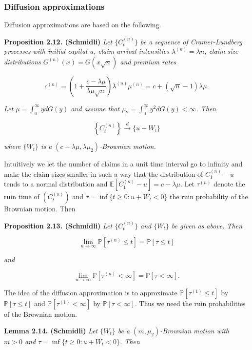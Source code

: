 \documentclass[a4paper,10pt,openany]{book}
\begin{document}
\hypertarget{diffusion-approximations}{%
\subsubsection{Diffusion approximations}\label{diffusion-approximations}}

Diffusion approximations are based on the following.

\textbf{Proposition 2.12. (Schmidli)} \emph{Let \(\{C_t^{(n)}\}\) be a sequence of Cramer-Lundberg processes with initial capital \(u\), claim arrival intensities \(\lambda^{(n)}=\lambda n\), claim size distributions \(G^{(n)}(x)=G(x\sqrt n)\) and premium rates}

\[
c^{(n)}=\left(1 + \frac{c-\lambda \mu}{\lambda \mu\sqrt n}\right)\lambda^{(n)}\mu^{(n)}=c+(\sqrt n -1)\lambda\mu.
\]

\emph{Let \(\mu=\int_0^\infty y dG(y)\) and assume that \(\mu_2 = \int_0^\infty y^2dG(y)<\infty\). Then}

\[
\left\{C_t^{(n)}\right\}\stackrel{d}{\to} \{u+ W_t\}
\]

\emph{where \(\{W_t\}\) is a \((c-\lambda \mu,\lambda\mu_2)\)-Brownian motion.}

Intuitively we let the number of claims in a unit time interval go to infinity and make the claim sizes smaller in such a way that the distribution of \(C^{(n)}_1 − u\) tends to a normal distribution and \(\mathbb E [C^{(n)}_1 − u] = c − \lambda \mu\). Let \(\tau^{(n)}\) denote the ruin time of \((C^{(n)}_t)\) and \(\tau = \inf\{t \ge 0 : u+W_t < 0\}\) the ruin probability of the Brownian motion. Then

\textbf{Proposition 2.13. (Schmidli)} \emph{Let \(\{C_t^{(n)}\}\) and \(\{W_t\}\) be given as above. Then}

\[
\lim_{n\to\infty} \mathbb P[\tau^{(n)}\le t]=\mathbb P[\tau \le t]
\]

\emph{and}

\[
\lim_{n\to\infty} \mathbb P[\tau^{(n)}< \infty]=\mathbb P[\tau < \infty].
\]

The idea of the diffusion approximation is to approximate \(\mathbb P [\tau^{(1)}\le t]\) by \(\mathbb P [\tau\le t]\) and \(\mathbb P [\tau^{(1)} < \infty]\) by \(\mathbb P [\tau < \infty]\). Thus we need the ruin probabilities of the Brownian motion.

\textbf{Lemma 2.14. (Schmidli)} \emph{Let \(\{W_t\}\) be a \((m,\mu_2)\)-Brownian motion with \(m > 0\) and \(\tau = \inf\{t\ge 0 : u+W_t <0\}\). Then}
\end{document}
